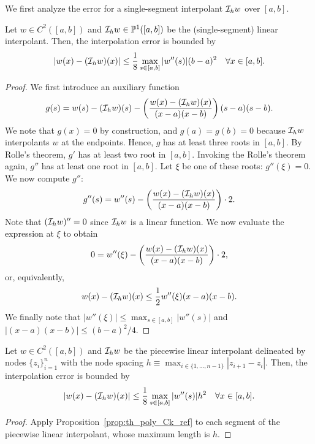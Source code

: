 We first analyze the error for a single-segment interpolant $\mathcal{I}_h w$ over $[a,b]$.
\begin{proposition}
  \label{prop:th_poly_Ck_ref}
  Let $w \in C^2([a,b])$ and $\mathcal{I}_h w \in \mathbb{P}^1([a,b])$ be the (single-segment) linear interpolant. Then, the interpolation error is bounded by
  \begin{equation*}
    | w(x) - (\mathcal{I}_h w)(x) | \leq \frac{1}{8} \max_{s \in [a,b]} |w''(s)| (b-a)^2 \quad \forall x \in [a,b].
  \end{equation*}
  \begin{proof}
    We first introduce an auxiliary function
    \begin{equation*}
      g(s) = w(s) - (\mathcal{I}_h w)(s) - \left( \frac{w(x) - (\mathcal{I}_h w)(x)}{(x-a)(x-b)} \right) (s-a)(s-b).
    \end{equation*}
    We note that $g(x) = 0$ by construction, and $g(a) = g(b) = 0$ because $\mathcal{I}_h w$ interpolants $w$ at the endpoints. Hence, $g$ has at least three roots in $[a,b]$. By Rolle's theorem, $g'$ has at least two root in $[a,b]$.  Invoking the Rolle's theorem again, $g''$ has at least one root in $[a,b]$. Let $\xi$ be one of these roots: $g''(\xi) = 0$. We now compute $g''$:
    \begin{equation*}
      g''(s) = w''(s) -  \left( \frac{w(x) - (\mathcal{I}_h w)(x)}{(x-a)(x-b)} \right) \cdot 2.
    \end{equation*}
    Note that $(\mathcal{I}_h w)'' = 0$ since $\mathcal{I}_h w$ is a linear function. We now evaluate the expression at $\xi$ to obtain
    \begin{equation*}
      0 = w''(\xi) - \left( \frac{w(x) - (\mathcal{I}_h w)(x)}{(x-a)(x-b)} \right) \cdot 2,
    \end{equation*}
    or, equivalently,
    \begin{equation*}
      w(x) - (\mathcal{I}_h w)(x) \leq \frac{1}{2} w''(\xi) (x-a)(x-b).
    \end{equation*}
    We finally note that $|w''(\xi)| \leq \max_{s \in [a,b]}|w''(s)|$ and $| (x-a)(x-b) | \leq (b-a)^2/4$.
  \end{proof}
\end{proposition}
\begin{proposition}
  \label{prop:th_poly_Ck_multi}
  Let $w \in C^2([a,b])$ and $\mathcal{I}_h w$ be the piecewise linear interpolant delineated by nodes $\{z_i\}_{i=1}^n$ with the node spacing $h \equiv \max_{i \in \{ 1,\dots,n-1 \} } |z_{i+1} - z_i|$. Then, the interpolation error is bounded by
  \begin{equation*}
    | w(x) - (\mathcal{I}_h w)(x) | \leq \frac{1}{8} \max_{s \in [a,b]} |w''(s)| h^2 \quad \forall x \in [a,b].
  \end{equation*}
  \begin{proof}
    Apply Proposition~\ref{prop:th_poly_Ck_ref} to each segment of the piecewise linear interpolant, whose maximum length is $h$.
  \end{proof}
\end{proposition}
